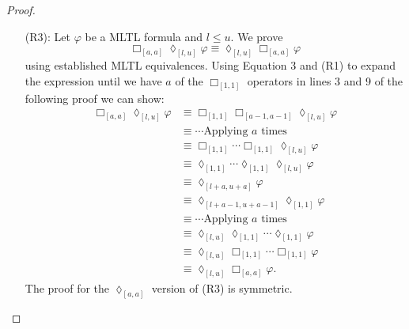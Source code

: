 \documentclass{article}
\begin{document}
\begin{proof}
\begin{enumerate}
\begin{enumerate}
    \item  ($\leftarrow$)
        Conversely, let $\pi$ be defined such that $\pi \models \Box_{[l_3,u_3]}{(\Box_{[l_1,u_1]}{\varphi} \land \Box_{[l_2,u_2]}{\psi})}$.
        We show that $\pi \models (\Box_{[l_3,u_3]}{\Box_{[l_1,u_1]}{\varphi}}) \land (\Box_{[l_3,u_3]}{\Box_{[l_2,u_2]}{\psi}})$ using the MLTL semantics.
        Then $\pi_i \models \Box_{[l_1,u_1]}{\varphi}$ and $\pi_i \models \Box_{[l_2,u_2]}{\psi}$ for all $i \in [l_3,u_3]$.
        Using the semantic definitions of $\land$ and $\Box_{I}{}$, we see that $\pi \models \Box_{[l_3,u_3]}{\Box_{[l_1,u_1]}{\varphi}}$ and $\pi \models \Box_{[l_3,u_3]}{\Box_{[l_2,u_2]}{\psi}}$, so $\pi \models (\Box_{[l_3,u_3]}{\Box_{[l_1,u_1]}{\varphi}}) \land (\Box_{[l_3,u_3]}{\Box_{[l_2,u_2]}{\psi}})$.
    
    \end{enumerate}

The proof for the $\lozenge$ version of (R2) is symmetric.



    \item[(R3):] Let $\varphi$ be a MLTL formula and $l \leq u$. 
We prove 
$$
    \Box_{[a,a]}{\lozenge_{[l,u]}{\varphi}} \equiv \lozenge_{[l,u]}{\Box_{[a,a]}{\varphi}}
$$
using established MLTL equivalences.
Using Equation 3 and (R1) to expand the expression until we have $a$ of the $\Box_{[1,1]}{}$ operators in lines 3 and 9 of the following proof we can show:
\begin{align*}
    \Box_{[a,a]}{\lozenge_{[l,u]}{\varphi}} & \equiv \Box_{[1,1]}{\Box_{[a-1,a-1]}{\lozenge_{[l,u]}{\varphi}}} \\
    & \equiv \cdots \text{Applying } a \text{ times} \\
    & \equiv \Box_{[1,1]}{\cdots \Box_{[1,1]}{\lozenge_{[l,u]}{\varphi}}} \\
    & \equiv \lozenge_{[1,1]}{\cdots \lozenge_{[1,1]}{\lozenge_{[l,u]}{\varphi}}} \\
    & \equiv \lozenge_{[l+a,u+a]}{\varphi} \\
    & \equiv \lozenge_{[l+a-1,u+a-1]}{\lozenge_{[1,1]}{\varphi}} \\
    & \equiv \cdots \text{Applying } a \text{ times} \\
    & \equiv \lozenge_{[l,u]}{\lozenge_{[1,1]}{\cdots \lozenge_{[1,1]}{\varphi}}} \\
    & \equiv \lozenge_{[l,u]}{\Box_{[1,1]}{\cdots \Box_{[1,1]}{\varphi}}} \\
    & \equiv \lozenge_{[l,u]}{\Box_{[a,a]}{\varphi}}.
\end{align*} 
The proof for the $\lozenge_{[a,a]}$ version of (R3) is symmetric.




\end{enumerate}
\end{proof}
\end{document}
